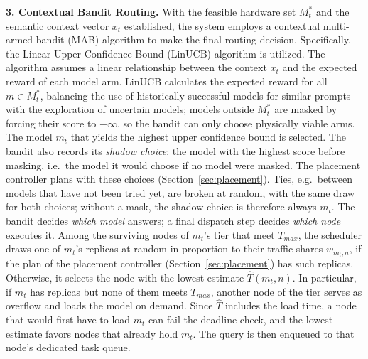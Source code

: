 \textbf{3. Contextual Bandit Routing.}
With the feasible hardware set $M_t^*$ and the semantic context vector $x_t$ established, the system employs a contextual multi-armed bandit (MAB) algorithm to make the final routing decision.
Specifically, the Linear Upper Confidence Bound (LinUCB) algorithm \cite{linucb} is utilized. The algorithm assumes a linear relationship between the context $x_t$ and the expected reward of each model arm.
LinUCB calculates the expected reward for all $m \in M_t^*$, balancing the use of historically successful models for similar prompts with the exploration of uncertain models; models outside $M_t^*$ are masked by forcing their score to $-\infty$, so the bandit can only choose physically viable arms.
The model $m_t$ that yields the highest upper confidence bound is selected. The bandit also records its \emph{shadow choice}: the model with the highest score before masking, i.e.\ the model it would choose if no model were masked. The placement controller plans with these choices (Section~\ref{sec:placement}).
Ties, e.g.\ between models that have not been tried yet, are broken at random, with the same draw for both choices; without a mask, the shadow choice is therefore always $m_t$.
The bandit decides \emph{which model} answers; a final dispatch step decides \emph{which node} executes it.
Among the surviving nodes of $m_t$'s tier that meet $T_{max}$, the scheduler draws one of $m_t$'s replicas at random in proportion to their traffic shares $w_{m_t,n}$, if the plan of the placement controller (Section~\ref{sec:placement}) has such replicas.
Otherwise, it selects the node with the lowest estimate $\hat{T}(m_t, n)$.
In particular, if $m_t$ has replicas but none of them meets $T_{max}$, another node of the tier serves as overflow and loads the model on demand.
Since $\hat{T}$ includes the load time, a node that would first have to load $m_t$ can fail the deadline check, and the lowest estimate favors nodes that already hold $m_t$.
The query is then enqueued to that node's dedicated task queue.

